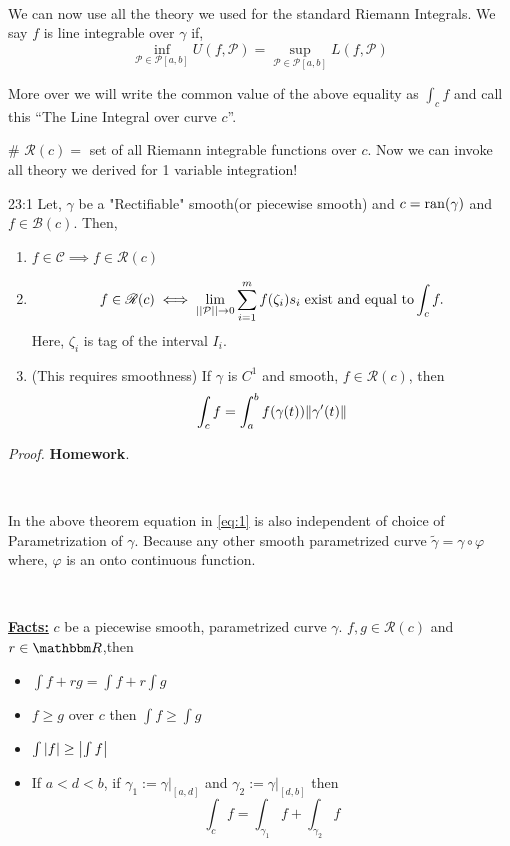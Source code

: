 \documentclass[../Analysis-3]{subfiles}
\begin{document}
\

We can now use all the theory we used for the standard Riemann Integrals. We say $f$ is line integrable over $\gamma$ if,
\[\inf_{\mathcal{P} \in \mathscr{P}[a,b]} U(f,\mathcal{P}) = \sup_{\mathcal{P} \in \mathscr{P}[a,b]} L(f,\mathcal{P})\]

More over we will write the common value of the above equality as $\int_c f$ and call this ``The Line Integral over curve $c$''.

\# \textbf{$\mathscr{R}(c)=$} set of all Riemann integrable functions over $c$. Now we can invoke all theory we derived for 1 variable integration!

\begin{Thm}{}{23:1}
    Let, $\gamma$ be a "Rectifiable" smooth(or piecewise smooth) and $c = \operatorname{ran}(\gamma)$ and $f \in \mathscr{B}(c)$. Then,
    \begin{enumerate}
        \item $f \in \mathscr{C} \implies f \in \mathscr{R}(c)$
        \item \[ f \in \mathscr{R}(c) \iff \lim_{||\mathcal{P}||\to 0} \sum_{i=1}^{m} f(\zeta_i)s_i \hspace{0.1cm} \text{exist and equal to}\int_c f.\] Here, $\zeta_i$ is tag of the interval $I_i$.

        \item (This requires smoothness) If $\gamma$ is $C^1$ and smooth, $f \in \mathscr{R}(c)$, then
          \[\int_c f = \int_a^b f(\gamma(t))\norm{\gamma'(t)} \label{eq:1}\]

    \end{enumerate}
\end{Thm}

\textit{Proof.} \textbf{Homework}.

\

In the above theorem equation in \ref{eq:1} is also independent of choice of Parametrization of $\gamma$. Because any other smooth parametrized curve $\tilde{\gamma} = \gamma \circ \varphi$ where, $\varphi$ is an onto continuous function.

\

\textbf{\underline{Facts:}} $c$ be a piecewise smooth, parametrized curve $\gamma$. $f,g \in \mathscr{R}(c)$ and $r \in \R$,then
\begin{itemize}
    \item $\int f+rg = \int f + r\int g $
    \item $f \ge g$ over $c$ then $\int f \ge \int g$
    \item $\int \abs{f} \ge \abs{\int f}$
    \item If $a<d<b$, if $\gamma_1 := \gamma |_{[a,d]}$ and $\gamma_2 := \gamma |_{[d,b]}$ then
      \[\int_c f = \int_{\gamma_1}f + \int_{\gamma_2} f \]
\end{itemize}
\end{document}
